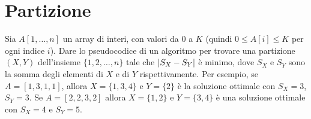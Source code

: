 \clearpage

\section{Partizione}

\begin{esercizio}
Sia $A[1,\ldots,n]$ un array di interi, con valori da $0$ a $K$ (quindi $0 \le A[i] \le K$ per ogni indice $i$). Dare lo pseudocodice di un algoritmo per trovare una partizione $(X,Y)$ dell'insieme $\{1,2,\ldots,n\}$ tale che $\left\lvert{S_X - S_Y}\right\rvert$ \`e minimo, dove $S_X$ e $S_Y$ sono la somma degli elementi di $X$ e di $Y$ rispettivamente. Per esempio, se $A = [1,3,1,1]$, allora $X = \{1,3,4\}$ e $Y = \{2\}$ \`e la soluzione ottimale con $S_X = 3$, $S_Y = 3$. Se $A = [2,2,3,2]$ allora $X = \{1,2\}$ e $Y = \{3,4\}$ \`e una soluzione ottimale con $S_X = 4$ e $S_Y = 5$.
\end{esercizio}

\clearpage

